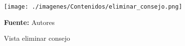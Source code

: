 \begin{figure}[!htb]
  \begin{center}
\texttt{[image: ./imagenes/Contenidos/eliminar\_consejo.png]}
    \caption{Vista eliminar consejo}
    \label{fig:Vista_eliminar_consejo}
    \textbf{Fuente:}  Autores
  \end{center}
\end{figure}
